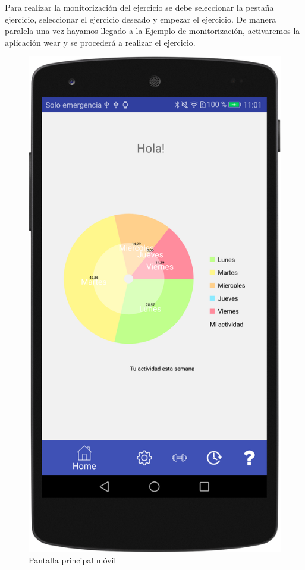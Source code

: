 Para realizar la monitorización del ejercicio se debe seleccionar la pestaña ejercicio, seleccionar el ejercicio deseado y empezar el ejercicio. De manera paralela una vez hayamos llegado a la Ejemplo de monitorización, activaremos la aplicación wear y se procederá a realizar el ejercicio.

\begin{figure}[H]
	\centering
	\includegraphics[scale=0.10]{imagenes/m2.png}
	\caption{Pantalla principal móvil}
	\label{Realización ejercicio 1}
\end{figure}


